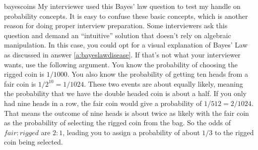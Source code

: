 \begin{answer}{bayescoins}
My interviewer used this Bayes' law question to test my handle on probability concepts.
It is easy to confuse these basic concepts, which is another reason for doing proper interview preparation.
Some interviewers ask this question and demand an ``intuitive'' solution that doesn't rely on algebraic manipulation.
In this case, you could opt for a visual explanation of Bayes' Law as discussed in answer \ref{a:bayeslawdisease}.
If that's not what your interviewer wants, use the following argument.
You know the probability of choosing the rigged coin is $1/1000$.
You also know the probability of getting ten heads from a fair coin is $1/2^{10} = 1/1024$.
These two events are about equally likely, meaning the probability that we have the double headed coin is about a half.
If you only had nine heads in a row, the fair coin would give a probability of $1/512 = 2/1024$.
That means the outcome of nine heads is about twice as likely with the fair coin as the probability of selecting the rigged coin from the bag.
So the odds of ${fair}{:}{rigged}$ are $2{:}1$, leading you to assign a probability of about $1/3$ to the rigged coin being selected.
\end{answer}

